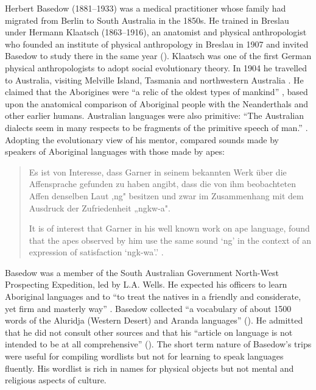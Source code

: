 \documentclass[output=paper]{langsci/langscibook}
\begin{document}
Herbert Basedow (1881--1933) was a medical practitioner whose family had migrated from Berlin to South Australia in the 1850s. He trained in Breslau under Hermann Klaatsch (1863--1916), an anatomist and physical anthropologist who founded an institute of physical anthropology in Breslau in 1907 \citep[84]{stocking_virchow_1996} and invited Basedow to study there in the same year (\citealt[ix]{basedow_australian_1925}). Klaatsch was one of the first German physical anthropologists to adopt social evolutionary theory. In 1904 he travelled to Australia, visiting Melville Island, Tasmania and northwestern Australia \citep[423]{oetteking_hermann_1916}. He claimed that the Aborigines were “a relic of the oldest types of mankind” \citep[42]{mcgregor_imagined_1997}, based upon the anatomical comparison of Aboriginal people with the Neanderthals and other earlier humans. Australian languages were also primitive: “The Australian dialects seem in many respects to be fragments of the primitive speech of man.” \citep[38]{klaatsch_evolution_1923}. Adopting the evolutionary view of his mentor, \citet[208]{basedow_vergleichende_1908} compared sounds made by speakers of Aboriginal languages with those made by apes: 

\begin{quote}
    Es ist von Interesse, dass Garner in seinem bekannten Werk über die Affensprache gefunden zu haben angibt, dass die von ihm beobachteten Affen denselben Laut ,ng" besitzen und zwar im Zusammenhang mit dem Ausdruck der Zufriedenheit „ngkw-a". 

    It is of interest that Garner in his well known work on ape language, found that the apes observed by him use the same sound ‘ng’ in the context of an expression of satisfaction ‘ngk-wa’.’ \citep[208]{basedow_vergleichende_1908}.
\end{quote}

Basedow was a member of the South Australian Government North-West Prospecting Expedition, led by L.A. Wells. He expected his officers to learn Aboriginal languages and to “to treat the natives in a friendly and considerate, yet firm and masterly way” \citep[49]{zogbaum_changing_2010}. Basedow collected “a vocabulary of about 1500 words of the Aluridja (Western Desert) and Aranda languages” (\citealt[v]{harmstorf_introduction_2004}). He admitted that he did not consult other sources and that his “article on language is not intended to be at all comprehensive” (\citealt[xii]{basedow_australian_1925}). The short term nature of Basedow’s trips were useful for compiling wordlists but not for learning to speak languages fluently. His wordlist \citep{basedow_vergleichende_1908} is rich in names for physical objects but not mental and religious aspects of culture. 
\end{document}

